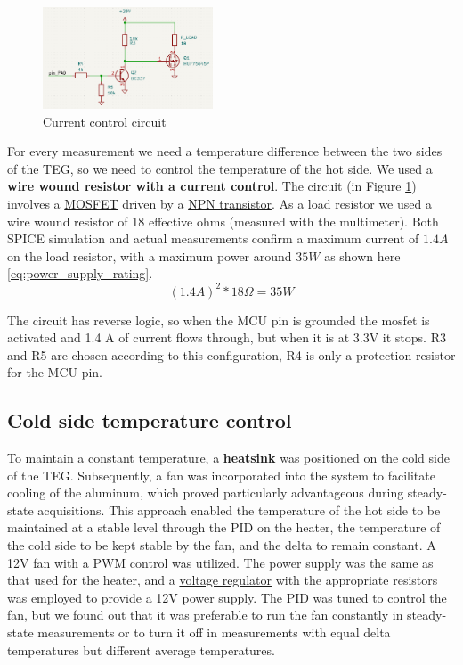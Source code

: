 \begin{figure}
  \centering
  \includegraphics[width=0.45\textwidth]{assets/heat_control.png}
  \caption{Current control circuit}
  \label{fig:heat_control}
\end{figure}

For every measurement we need a temperature difference between the two sides of the TEG, so we
need to control the temperature of the hot side.
We used a \textbf{wire wound resistor with a current control}. The circuit (in Figure \ref{fig:heat_control}) involves a \href{https://www.onsemi.com/pdf/datasheet/huf75645s3s-d.pdf}{MOSFET} driven by a \href{https://diotec.com/request/datasheet/bc337.pdf}{NPN transistor}. As a load resistor we used a wire wound resistor of 18 effective ohms (measured with the multimeter). Both SPICE simulation and actual measurements confirm a maximum current of $ 1.4 A $ on the load resistor, with a maximum power around $ 35 W $ as shown here \ref{eq:power_supply_rating}. \\

\begin{equation}
  (1.4A)^2 * 18\Omega = 35W
  \label{eq:power_supply_rating}
\end{equation}

The circuit has reverse logic, so when the MCU pin is grounded the mosfet is activated and 1.4 A of current flows through, but when it is at 3.3V it stops. R3 and R5 are chosen according to this configuration, R4 is only a protection resistor for the MCU pin.


\subsection{Cold side temperature control}

To maintain a constant temperature, a \textbf{heatsink} was positioned on the cold side of the TEG. Subsequently, a fan was incorporated into the system to facilitate cooling of the aluminum, which proved particularly advantageous during steady-state acquisitions. This approach enabled the temperature of the hot side to be maintained at a stable level through the PID on the heater, the temperature of the cold side to be kept stable by the fan, and the delta to remain constant. A 12V fan with a PWM control was utilized. The power supply was the same as that used for the heater, and a \href{https://www.ti.com/lit/ds/symlink/lm317l.pdf}{voltage regulator} with the appropriate resistors was employed to provide a 12V power supply. The PID was tuned to control the fan, but we found out that it was preferable to run the fan constantly in steady-state measurements or to turn it off in measurements with equal delta temperatures but different average temperatures. 

